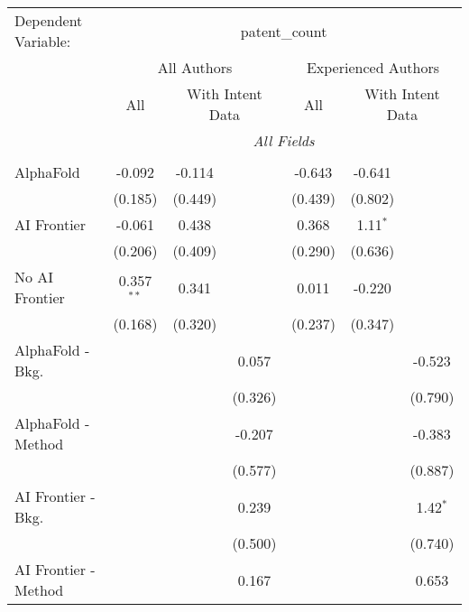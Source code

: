 \begingroup
\centering
\begin{tabular}{lcccccc}
   \tabularnewline \midrule \midrule
   Dependent Variable: & \multicolumn{6}{c}{patent\_count}\\
 & \multicolumn{3}{c}{All Authors} & \multicolumn{3}{c}{Experienced Authors} \\
\cmidrule(lr){2-4} \cmidrule(lr){5-7}
 & \multicolumn{1}{c}{All} & \multicolumn{2}{c}{With Intent Data} & \multicolumn{1}{c}{All} & \multicolumn{2}{c}{With Intent Data} \\
\cmidrule(lr){2-2} \cmidrule(lr){3-4} \cmidrule(lr){5-5} \cmidrule(lr){6-7}
 & \multicolumn{6}{c}{\textit{All Fields}} \\ \\
   AlphaFold               & -0.092       & -0.114  &             & -0.643  & -0.641     &   \\   
                           & (0.185)      & (0.449) &             & (0.439) & (0.802)    &   \\   
   AI Frontier             & -0.061       & 0.438   &             & 0.368   & 1.11$^{*}$ &   \\   
                           & (0.206)      & (0.409) &             & (0.290) & (0.636)    &   \\   
   No AI Frontier          & 0.357$^{**}$ & 0.341   &             & 0.011   & -0.220     &   \\   
                           & (0.168)      & (0.320) &             & (0.237) & (0.347)    &   \\   
   AlphaFold - Bkg.        &              &         & 0.057       &         &            & -0.523\\   
                           &              &         & (0.326)     &         &            & (0.790)\\   
   AlphaFold - Method      &              &         & -0.207      &         &            & -0.383\\   
                           &              &         & (0.577)     &         &            & (0.887)\\   
   AI Frontier - Bkg.      &              &         & 0.239       &         &            & 1.42$^{*}$\\   
                           &              &         & (0.500)     &         &            & (0.740)\\   
   AI Frontier - Method    &              &         & 0.167       &         &            & 0.653\\   

\end{tabular}
